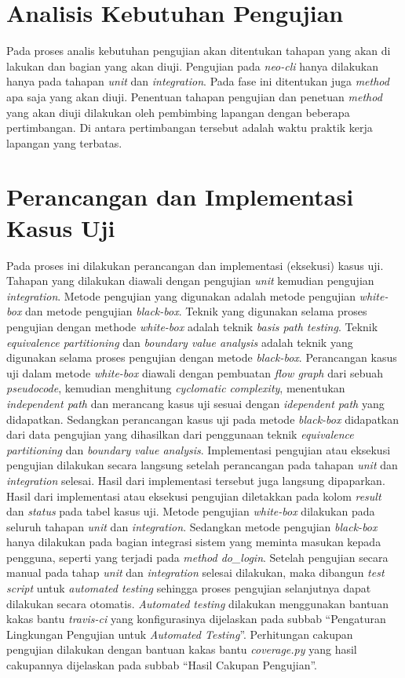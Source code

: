 \section{Analisis Kebutuhan Pengujian}

Pada proses analis kebutuhan pengujian akan ditentukan tahapan yang
akan di lakukan dan bagian yang akan diuji. Pengujian pada
\emph{neo-cli} hanya dilakukan hanya pada tahapan \emph{unit} dan
\emph{integration}.  Pada fase ini ditentukan juga \emph{method}
apa saja yang akan diuji. Penentuan tahapan pengujian dan penetuan
\emph{method} yang akan diuji dilakukan oleh pembimbing lapangan
dengan beberapa pertimbangan. Di antara pertimbangan tersebut adalah
waktu praktik kerja lapangan yang terbatas.

\section{Perancangan dan Implementasi Kasus Uji}

Pada proses ini dilakukan perancangan dan implementasi (eksekusi)
kasus uji. Tahapan yang dilakukan diawali dengan pengujian \emph{unit}
kemudian pengujian \emph{integration}. Metode pengujian yang digunakan
adalah metode pengujian \emph{white-box} dan metode pengujian
\emph{black-box}. Teknik yang digunakan selama proses pengujian dengan
methode \emph{white-box} adalah teknik \emph{basis path testing}.
Teknik \emph{equivalence partitioning} dan \emph{boundary value
  analysis} adalah teknik yang digunakan selama proses pengujian
dengan metode \emph{black-box}. Perancangan kasus uji dalam metode
\emph{white-box} diawali dengan pembuatan \emph{flow graph} dari
sebuah \emph{pseudocode}, kemudian menghitung \emph{cyclomatic
  complexity}, menentukan \emph{independent path} dan merancang kasus
uji sesuai dengan \emph{idependent path} yang didapatkan. Sedangkan
perancangan kasus uji pada metode \emph{black-box} didapatkan dari
data pengujian yang dihasilkan dari penggunaan teknik
\emph{equivalence partitioning} dan \emph{boundary value analysis}.
Implementasi pengujian atau eksekusi pengujian dilakukan secara
langsung setelah perancangan pada tahapan \emph{unit} dan
\emph{integration} selesai. Hasil dari implementasi tersebut juga
langsung dipaparkan. Hasil dari implementasi atau eksekusi pengujian
diletakkan pada kolom \emph{result} dan \emph{status} pada tabel kasus
uji. Metode pengujian \emph{white-box} dilakukan pada seluruh tahapan
\emph{unit} dan \emph{integration}. Sedangkan metode pengujian
\emph{black-box} hanya dilakukan pada bagian integrasi sistem yang
meminta masukan kepada pengguna, seperti yang terjadi pada
\emph{method do\_login}. Setelah pengujian secara manual pada tahap
\emph{unit} dan \emph{integration} selesai dilakukan, maka dibangun
\emph{test script} untuk \emph{automated testing} sehingga proses
pengujian selanjutnya dapat dilakukan secara otomatis. \emph{Automated
  testing} dilakukan menggunakan bantuan kakas bantu \emph{travis-ci}
yang konfigurasinya dijelaskan pada subbab ``Pengaturan Lingkungan
Pengujian untuk \emph{Automated Testing}''. Perhitungan cakupan
pengujian dilakukan dengan bantuan kakas bantu \emph{coverage.py} yang
hasil cakupannya dijelaskan pada subbab ``Hasil Cakupan Pengujian''.

